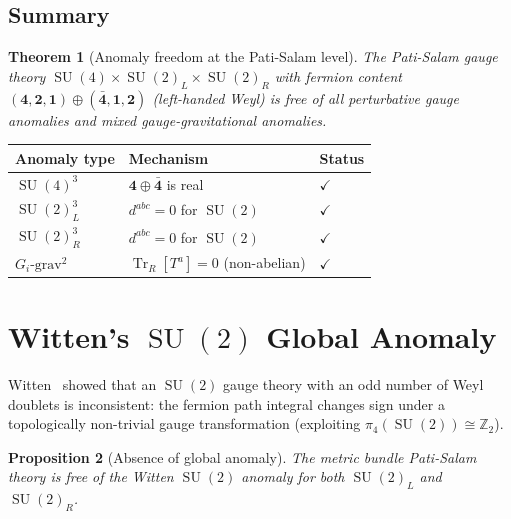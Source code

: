 \documentclass[12pt,a4paper]{article}
\newtheorem{theorem}{Theorem}[section]
\newtheorem{proposition}[theorem]{Proposition}
\theoremstyle{definition}
\newcommand{\Tr}{\operatorname{Tr}}
\newcommand{\SU}{\operatorname{SU}}
\newcommand{\Z}{\mathbb{Z}}
\begin{document}
\subsection{Summary}

\begin{theorem}[Anomaly freedom at the Pati-Salam level]
\label{thm:PS_anomaly_free}
The Pati-Salam gauge theory $\SU(4) \times \SU(2)_L \times \SU(2)_R$ with fermion content $(\mathbf{4}, \mathbf{2}, \mathbf{1}) \oplus (\bar{\mathbf{4}}, \mathbf{1}, \mathbf{2})$ (left-handed Weyl) is free of all perturbative gauge anomalies and mixed gauge-gravitational anomalies.
\end{theorem}

\begin{center}
\renewcommand{\arraystretch}{1.3}
\begin{tabular}{lll}
\toprule
\textbf{Anomaly type} & \textbf{Mechanism} & \textbf{Status} \\
\midrule
$\SU(4)^3$ & $\mathbf{4} \oplus \bar{\mathbf{4}}$ is real & $\checkmark$ \\
$\SU(2)_L^3$ & $d^{abc} = 0$ for $\SU(2)$ & $\checkmark$ \\
$\SU(2)_R^3$ & $d^{abc} = 0$ for $\SU(2)$ & $\checkmark$ \\
$G_i\text{-grav}^2$ & $\Tr_R[T^a] = 0$ (non-abelian) & $\checkmark$ \\
\bottomrule
\end{tabular}
\end{center}


\section{Witten's \texorpdfstring{$\SU(2)$}{SU(2)} Global Anomaly}
\label{sec:global_anomaly}

Witten~\cite{Witten1982} showed that an $\SU(2)$ gauge theory with an odd number of Weyl doublets is inconsistent: the fermion path integral changes sign under a topologically non-trivial gauge transformation (exploiting $\pi_4(\SU(2)) \cong \Z_2$).

\begin{proposition}[Absence of global anomaly]
\label{prop:witten}
The metric bundle Pati-Salam theory is free of the Witten $\SU(2)$ anomaly for both $\SU(2)_L$ and $\SU(2)_R$.
\end{proposition}
\end{document}
